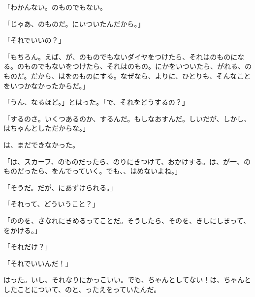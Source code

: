 「わかんない。のものでもない。

「じゃあ、のものだ。にいついたんだから。」

「それでいいの？」

「もちろん。えば、が、のものでもないダイヤをつけたら、それはのものになる。のものでもないをつけたら、それはのもの。にかをいついたら、がれる、のものだ。だから、はをのものにする。なぜなら、よりに、ひとりも、そんなことをいつかなかったからだ。」

「うん、なるほど。」とはった。「で、それをどうするの？」

「するのさ。いくつあるのか、するんだ。もしなおすんだ。しいだが、しかし、はちゃんとしただからな。」

は、まだできなかった。

「は、スカーフ、のものだったら、のりにきつけて、おかけする。は、が一、のものだったら、をんでっていく。でも、、はめないよね。」

「そうだ。だが、にあずけられる。」

「それって、どういうこと？」

「ののを、さなれにきめるってことだ。そうしたら、そのを、きしにしまって、をかける。」

「それだけ？」

「それでいいんだ！」

はった。いし、それなりにかっこいい。でも、ちゃんとしてない！は、ちゃんとしたことについて、のと、ったえをっていたんだ。

